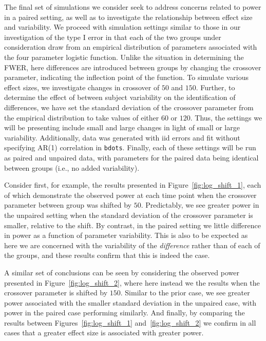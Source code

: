\documentclass{article}
\newcommand{\xt}{\texttt}
\begin{document}
The final set of simulations we consider seek to address concerns related to power in a paired setting, as well as to investigate the relationship between effect size and variability. We proceed with simulation settings similar to those in our investigation of the type I error in that each of the two groups under consideration draw from an empirical distribution of parameters associated with the four parameter logistic function. Unlike the situation in determining the FWER, here differences are introduced between groups by changing the crossover parameter, indicating the inflection point of the function. To simulate various effect sizes, we investigate changes in crossover of $50$ and $150$. Further, to determine the effect of between subject variability on the identification of differences, we have set the standard deviation of the crossover parameter from the empirical distribution to take values of either $60$ or $120$. Thus, the settings we will be presenting include small and large changes in light of small or large variability. Additionally, data was generated with iid errors and fit without specifying AR(1) correlation in \xt{bdots}. Finally, each of these settings will be run as paired and unpaired data, with parameters for the paired data being identical between groups (i.e., no added variability). 


Consider first, for example, the results presented in Figure~\ref{fig:log_shift_1}, each of which demonstrate the observed power at each time point when the crossover parameter between group was shifted by $50$. Predictably, we see greater power in the unpaired setting when the standard deviation of the crossover parameter is smaller, relative to the shift. By contrast, in the paired setting we little difference in power as a function of parameter variability. This is also to be expected as here we are concerned with the variability of the \textit{difference} rather than of each of the groups, and these results confirm that this is indeed the case. 


A similar set of conclusions can be seen by considering the observed power presented in Figure~\ref{fig:log_shift_2}, where here instead we the results when the crossover parameter is shifted by $150$. Similar to the prior case, we see greater power associated with the smaller standard deviation in the unpaired case, with power in the paired case performing similarly. And finally, by comparing the results between Figures~\ref{fig:log_shift_1} and~\ref{fig:log_shift_2} we confirm in all cases that a greater effect size is associated with greater power. 
\end{document}
